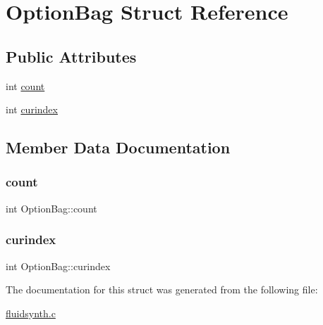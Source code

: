 \hypertarget{structOptionBag}{}\section{Option\+Bag Struct Reference}
\label{structOptionBag}
\subsection*{Public Attributes}
\begin{DoxyCompactItemize}
\item 
int \hyperlink{structOptionBag_af492b1001b86baf98187bc99aa7d92a9}{count}
\item 
int \hyperlink{structOptionBag_a06762dc34c01de54206e8afbcbfe61be}{curindex}
\end{DoxyCompactItemize}


\subsection{Member Data Documentation}
\mbox{\label{structOptionBag_af492b1001b86baf98187bc99aa7d92a9}} 
\subsubsection{\texorpdfstring{count}{count}}
{\footnotesize\ttfamily int Option\+Bag\+::count}

\mbox{\label{structOptionBag_a06762dc34c01de54206e8afbcbfe61be}} 
\subsubsection{\texorpdfstring{curindex}{curindex}}
{\footnotesize\ttfamily int Option\+Bag\+::curindex}



The documentation for this struct was generated from the following file\+:\begin{DoxyCompactItemize}
\item 
\hyperlink{fluidsynth_8c}{fluidsynth.\+c}\end{DoxyCompactItemize}
